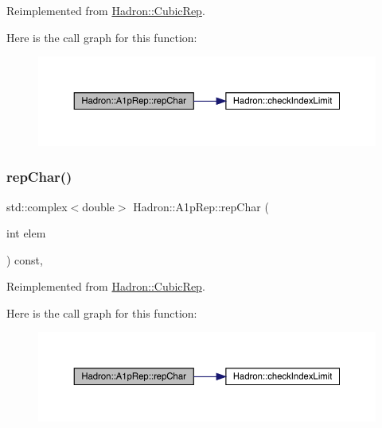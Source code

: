 Reimplemented from \mbox{\hyperlink{structHadron_1_1CubicRep_af45227106e8e715e84b0af69cd3b36f8}{Hadron\+::\+Cubic\+Rep}}.

Here is the call graph for this function\+:
\nopagebreak
\begin{figure}[H]
\begin{center}
\leavevmode
\includegraphics[width=350pt]{da/dc7/structHadron_1_1A1pRep_a9f59a2c62dd82462ab66f5a990939898_cgraph}
\end{center}
\end{figure}
\mbox{\label{structHadron_1_1A1pRep_a9f59a2c62dd82462ab66f5a990939898}} 
\subsubsection{\texorpdfstring{repChar()}{repChar()}\hspace{0.1cm}{\footnotesize\ttfamily [3/3]}}
{\footnotesize\ttfamily std\+::complex$<$double$>$ Hadron\+::\+A1p\+Rep\+::rep\+Char (\begin{DoxyParamCaption}\item[{int}]{elem }\end{DoxyParamCaption}) const\hspace{0.3cm}{\ttfamily [inline]}, {\ttfamily [virtual]}}



Reimplemented from \mbox{\hyperlink{structHadron_1_1CubicRep_af45227106e8e715e84b0af69cd3b36f8}{Hadron\+::\+Cubic\+Rep}}.

Here is the call graph for this function\+:
\nopagebreak
\begin{figure}[H]
\begin{center}
\leavevmode
\includegraphics[width=350pt]{da/dc7/structHadron_1_1A1pRep_a9f59a2c62dd82462ab66f5a990939898_cgraph}
\end{center}
\end{figure}
\mbox{\label{structHadron_1_1A1pRep_a23b801cc71ff71d666e68a3c065d3fae}} 
